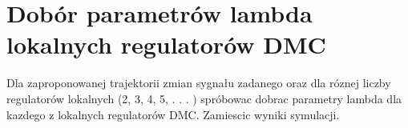 \section{Dobór parametrów lambda lokalnych regulatorów DMC}
\label{projekt:zad7}

Dla zaproponowanej trajektorii zmian sygnału zadanego oraz dla róznej liczby regulatorów
lokalnych (2, 3, 4, 5, . . . ) spróbowac dobrac parametry lambda dla kazdego z lokalnych
regulatorów DMC. Zamiescic wyniki symulacji.

%    



\newpage
